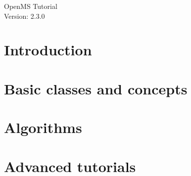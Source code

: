 \documentclass[a4paper]{article}
\newcommand{\+}{\discretionary{\mbox{\scriptsize$\hookleftarrow$}}{}{}}
\begin{document}
\begin{titlepage}
\vspace*{7cm}
\begin{center}
{\Large OpenMS Tutorial\\[1ex]\large Version: 2.3.0 }\\
\end{center}
\end{titlepage}


\setcounter{tocdepth}{2}
\tableofcontents
\pagebreak

\section{Introduction}

	
	\pagebreak
	
	\pagebreak
	
	\pagebreak
	


\pagebreak
\section{Basic classes and concepts}

	
	\pagebreak
	
	\pagebreak
	
	\pagebreak
	
	\pagebreak
	
	\pagebreak
	


\pagebreak
\section{Algorithms}

	
	\pagebreak
	
	\pagebreak
	
	\pagebreak
	

\pagebreak
\section{Advanced tutorials}

	
	\pagebreak
	
	\pagebreak
	
	\pagebreak
	
\end{document}
